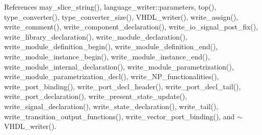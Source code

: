 References may\+\_\+slice\+\_\+string(), language\+\_\+writer\+::parameters, top(), type\+\_\+converter(), type\+\_\+converter\+\_\+size(), V\+H\+D\+L\+\_\+writer(), write\+\_\+assign(), write\+\_\+comment(), write\+\_\+component\+\_\+declaration(), write\+\_\+io\+\_\+signal\+\_\+post\+\_\+fix(), write\+\_\+library\+\_\+declaration(), write\+\_\+module\+\_\+declaration(), write\+\_\+module\+\_\+definition\+\_\+begin(), write\+\_\+module\+\_\+definition\+\_\+end(), write\+\_\+module\+\_\+instance\+\_\+begin(), write\+\_\+module\+\_\+instance\+\_\+end(), write\+\_\+module\+\_\+internal\+\_\+declaration(), write\+\_\+module\+\_\+parametrization(), write\+\_\+module\+\_\+parametrization\+\_\+decl(), write\+\_\+\+N\+P\+\_\+functionalities(), write\+\_\+port\+\_\+binding(), write\+\_\+port\+\_\+decl\+\_\+header(), write\+\_\+port\+\_\+decl\+\_\+tail(), write\+\_\+port\+\_\+declaration(), write\+\_\+present\+\_\+state\+\_\+update(), write\+\_\+signal\+\_\+declaration(), write\+\_\+state\+\_\+declaration(), write\+\_\+tail(), write\+\_\+transition\+\_\+output\+\_\+functions(), write\+\_\+vector\+\_\+port\+\_\+binding(), and $\sim$\+V\+H\+D\+L\+\_\+writer().

